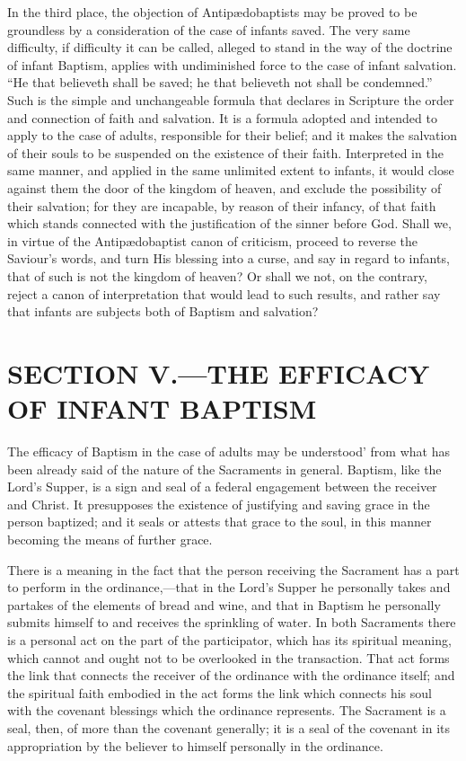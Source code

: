 \documentclass[]{book}
\begin{document}
In the third place, the objection of Antipædobaptists may be proved to be groundless by a consideration of the case of infants saved. The very same difficulty, if difficulty it can be called, alleged to stand in the way of the doctrine of infant Baptism, applies with undiminished force to the case of infant salvation. ``He that believeth shall be saved; he that believeth not shall be condemned.'' Such is the simple and unchangeable formula that declares in Scripture the order and connection of faith and salvation. It is a formula adopted and intended to apply to the case of adults, responsible for their belief; and it makes the salvation of their souls to be suspended on the existence of their faith. Interpreted in the same manner, and applied in the same unlimited extent to infants, it would close against them the door of the kingdom of heaven, and exclude the possibility of their salvation; for they are incapable, by reason of their infancy, of that faith which stands connected with the justification of the sinner before God. Shall we, in virtue of the Antipædobaptist canon of criticism, proceed to reverse the Saviour's words, and turn His blessing into a curse, and say in regard to infants, that of such is not the kingdom of heaven? Or shall we not, on the contrary, reject a canon of interpretation that would lead to such results, and rather say that infants are subjects both of Baptism and salvation?

\hypertarget{section-v.the-efficacy-of-infant-baptism}{%
\section{SECTION V.---THE EFFICACY OF INFANT BAPTISM}\label{section-v.the-efficacy-of-infant-baptism}}

The efficacy of Baptism in the case of adults may be understood' from what has been already said of the nature of the Sacraments in general. Baptism, like the Lord's Supper, is a sign and seal of a federal engagement between the receiver and Christ. It presupposes the existence of justifying and saving grace in the person baptized; and it seals or attests that grace to the soul, in this manner becoming the means of further grace.

There is a meaning in the fact that the person receiving the Sacrament has a part to perform in the ordinance,---that in the Lord's Supper he personally takes and partakes of the elements of bread and wine, and that in Baptism he personally submits himself to and receives the sprinkling of water. In both Sacraments there is a personal act on the part of the participator, which has its spiritual meaning, which cannot and ought not to be overlooked in the transaction. That act forms the link that connects the receiver of the ordinance with the ordinance itself; and the spiritual faith embodied in the act forms the link which connects his soul with the covenant blessings which the ordinance represents. The Sacrament is a seal, then, of more than the covenant generally; it is a seal of the covenant in its appropriation by the believer to himself personally in the ordinance.
\end{document}
